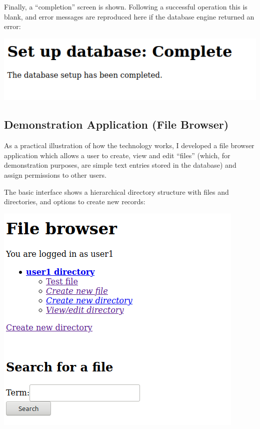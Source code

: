 \documentclass{report}
\begin{document}
Finally, a ``completion'' screen is shown. Following a successful operation this is blank, and error messages are reproduced here if the database engine returned an error:

\begin{center}
  \includegraphics[scale=0.5]{04-setup3.png}
\end{center}

\subsection{Demonstration Application (File Browser)}
As a practical illustration of how the technology works, I developed a file browser application which allows a user to create, view and edit ``files'' (which, for demonstration purposes, are simple text entries stored in the database) and assign permissions to other users.

The basic interface shows a hierarchical directory structure with files and directories, and options to create new records:

\begin{center}
  \includegraphics[scale=0.5]{05-browser1.png}
\end{center}
\end{document}
